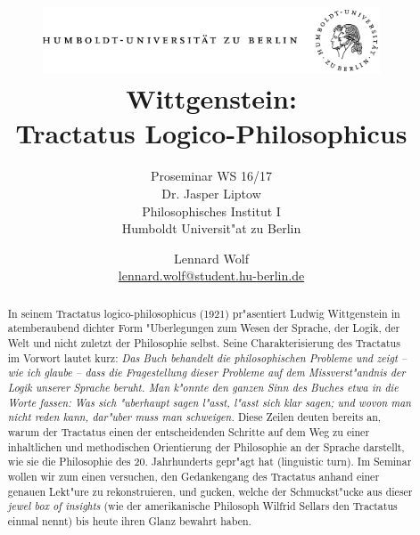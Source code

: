 \documentclass[emulatestandardclasses]{scrartcl}
\date{\vspace{-3ex}}
\begin{document}
\title{
	\includegraphics*[width=0.75\textwidth]{images/hu_logo.png}\\
	\vspace{24pt}
	Wittgenstein:\\Tractatus Logico-Philosophicus}
\subtitle{Proseminar WS 16/17\\
          Dr. Jasper Liptow\\
          Philosophisches Institut I \\ 
          Humboldt Universit"at zu Berlin}
\author{Lennard Wolf\\
        \small{\href{mailto:lennard.wolf@student.hu-berlin.de}{lennard.wolf@student.hu-berlin.de}}}
\maketitle
\begin{abstract}

In seinem Tractatus logico-philosophicus (1921) pr"asentiert Ludwig Wittgenstein in atemberaubend dichter Form "Uberlegungen zum Wesen der Sprache, der Logik, der Welt und nicht zuletzt der Philosophie selbst. Seine Charakterisierung des Tractatus im Vorwort lautet kurz: \emph{Das Buch behandelt die philosophischen Probleme und zeigt – wie ich glaube – dass die Fragestellung dieser Probleme auf dem Missverst"andnis der Logik unserer Sprache beruht. Man k"onnte den ganzen Sinn des Buches etwa in die Worte fassen: Was sich "uberhaupt sagen l"asst, l"asst sich klar sagen; und wovon man nicht reden kann, dar"uber muss man schweigen.} Diese Zeilen deuten bereits an, warum der Tractatus einen der entscheidenden Schritte auf dem Weg zu einer inhaltlichen und methodischen Orientierung der Philosophie an der Sprache darstellt, wie sie die Philosophie des 20. Jahrhunderts gepr"agt hat (linguistic turn). 
Im Seminar wollen wir zum einen versuchen, den Gedankengang des Tractatus anhand einer genauen Lekt"ure zu rekonstruieren, und gucken, welche der Schmuckst"ucke aus dieser \emph{jewel box of insights} (wie der amerikanische Philosoph Wilfrid Sellars den Tractatus einmal nennt) bis heute ihren Glanz bewahrt haben.


\end{abstract}
\newpage

\tableofcontents
\newpage
\end{document}
